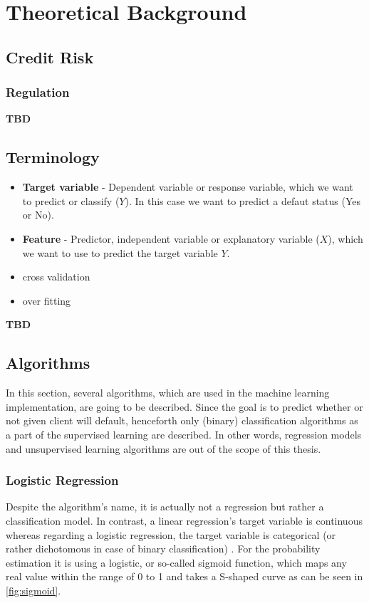 \chapter{Theoretical Background}
\label{chap:two}

\section{Credit Risk}

\subsection{Regulation}

\textbf{TBD}

\section{Terminology}
\begin{itemize}\setlength\itemsep{0em}
	\item \textbf{Target variable} - Dependent variable or response variable, which we want to predict or classify ($Y$). In this case we want to predict a defaut status (Yes or No).
	\item \textbf{Feature} - Predictor, independent variable or explanatory variable ($X$), which we want to use to predict the target variable $Y$.
	\item cross validation
	\item over fitting
\end{itemize}


\textbf{TBD}
\section{Algorithms}

In this section, several algorithms, which are used in the machine learning implementation, are going to be described. Since the goal is to predict whether or not given client will default, henceforth only (binary) classification algorithms as a part of the supervised learning are described. In other words, regression models and unsupervised learning algorithms are out of the scope of this thesis.
\subsection{Logistic Regression}

Despite the algorithm's name, it is actually not a regression but rather a classification model.
In contrast, a linear regression's target variable is continuous whereas regarding a logistic regression, the target variable is categorical (or rather dichotomous in case of binary classification) \citep{wendler2021data}.
For the probability estimation it is using a logistic, or so-called sigmoid function, which maps any real value within the range of 0 to 1 and takes a S-shaped curve as can be seen in \autoref{fig:sigmoid}.

